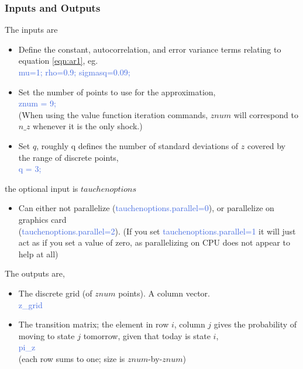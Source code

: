\subsubsection{Inputs and Outputs}
The inputs are
\begin{itemize}
 \item Define the constant, autocorrelation, and error variance terms relating to equation \ref{eqn:ar1}, eg. \\
    \textcolor{RoyalBlue}{mu=1; rho=0.9; sigmasq=0.09;}
 \item Set the number of points to use for the approximation, \\
    \textcolor{RoyalBlue}{znum = 9;} \\
    (When using the value function iteration commands, $znum$ will correspond to $n\_{}z$ whenever it is the only shock.)
 \item Set $q$, roughly q defines the number of standard deviations of $z$ covered by the range of discrete points, \\
   \textcolor{RoyalBlue}{q = 3;}
\end{itemize}
the optional input is $tauchenoptions$
\begin{itemize}
 \item Can either not parallelize (\textcolor{RoyalBlue}{tauchenoptions.parallel=0}), or parallelize on graphics card \\ (\textcolor{RoyalBlue}{tauchenoptions.parallel=2}).
    (If you set \textcolor{RoyalBlue}{tauchenoptions.parallel=1} it will just act as if you set a value of zero, as parallelizing on CPU does not appear to help at all)
\end{itemize}
The outputs are,
\begin{itemize}
 \item The discrete grid (of $znum$ points). A column vector. \\
    \textcolor{RoyalBlue}{z\_{}grid}
 \item The transition matrix; the element in row $i$, column $j$ gives the probability of moving to state $j$ tomorrow, given that today is state $i$, \\
    \textcolor{RoyalBlue}{pi\_{}z} \\
    (each row sums to one; size is $znum$-by-$znum$)
\end{itemize}






